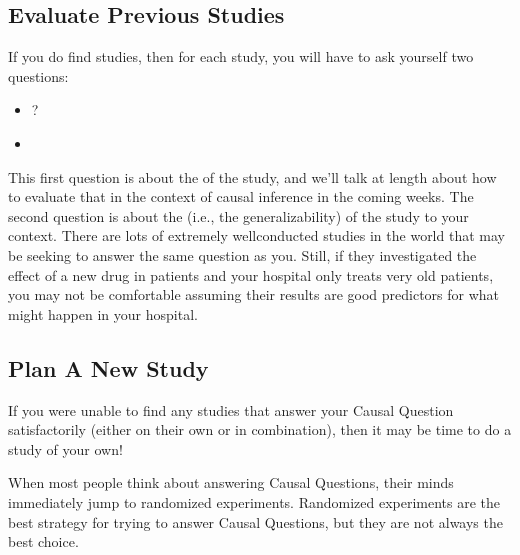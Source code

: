 \documentclass[letterpaper,10pt,english]{jupyterBook}
\begin{document}
\subsection{Evaluate Previous Studies}
\label{\detokenize{30_questions/35_using_causal_questions:evaluate-previous-studies}}
\sphinxAtStartPar
If you do find studies, then for each study, you will have to ask yourself two questions:
\begin{itemize}
\item {} 
\sphinxAtStartPar
{}?

\item {} 
\sphinxAtStartPar
{}

\end{itemize}

\sphinxAtStartPar
This first question is about the  of the study, and we’ll talk at length about how to evaluate that in the context of causal inference in the coming weeks. The second question is about the  (i.e., the generalizability) of the study to your context. There are lots of extremely well\sphinxhyphen{}conducted studies in the world that may be seeking to answer the same question as you. Still, if they investigated the effect of a new drug in  patients and your hospital only treats very old patients, you may not be comfortable assuming their results are good predictors for what might happen in your hospital.


\subsection{Plan A New Study}
\label{\detokenize{30_questions/35_using_causal_questions:plan-a-new-study}}
\sphinxAtStartPar
If you were unable to find any studies that answer your Causal Question satisfactorily (either on their own or in combination), then it may be time to do a study of your own!

\sphinxAtStartPar
When most people think about answering Causal Questions, their minds immediately jump to randomized experiments. Randomized experiments are  the best strategy for trying to answer Causal Questions, but they are not always the best choice.
\end{document}
